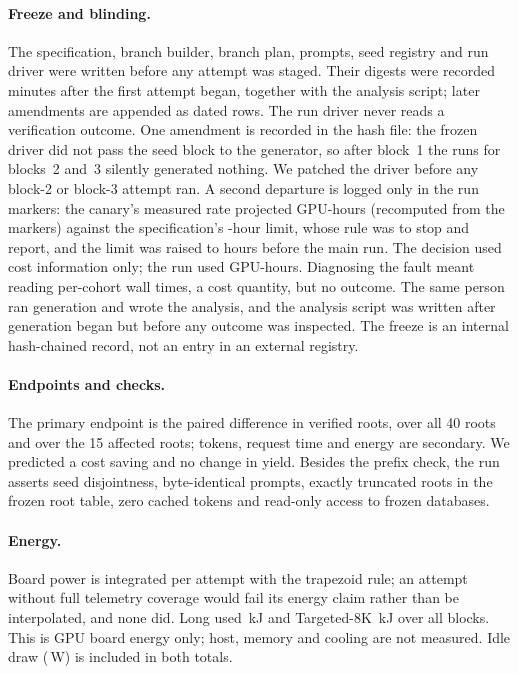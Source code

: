 \paragraph{Freeze and blinding.}
The specification, branch builder, branch plan, prompts, seed registry and run driver were written before any attempt was staged.  Their digests were recorded \CapHashDelayMin{} minutes after the first attempt began, together with the analysis script; later amendments are appended as dated rows.  The run driver never reads a verification outcome.  One amendment is recorded in the hash file: the frozen driver did not pass the seed block to the generator, so after block~1 the runs for blocks~2 and~3 silently generated nothing.  We patched the driver before any block-2 or block-3 attempt ran.  A second departure is logged only in the run markers: the canary's measured rate projected \CapCanaryProjHours{} GPU-hours (recomputed from the markers) against the specification's \CapBudgetFrozen{}-hour limit, whose rule was to stop and report, and the limit was raised to \CapBudgetRaised{} hours before the main run.  The decision used cost information only; the run used \CapRunGPUHours{} GPU-hours.  Diagnosing the fault meant reading per-cohort wall times, a cost quantity, but no outcome.  The same person ran generation and wrote the analysis, and the analysis script was written after generation began but before any outcome was inspected.  The freeze is an internal hash-chained record, not an entry in an external registry.

\paragraph{Endpoints and checks.}
The primary endpoint is the paired difference in verified roots, over all 40 roots and over the 15 affected roots; tokens, request time and energy are secondary.  We predicted a cost saving and no change in yield.  Besides the prefix check, the run asserts seed disjointness, byte-identical prompts, exactly \CapAffectedRoots{} truncated roots in the frozen root table, zero cached tokens and read-only access to frozen databases.

\paragraph{Energy.}
Board power is integrated per attempt with the trapezoid rule; an attempt without full telemetry coverage would fail its energy claim rather than be interpolated, and none did.  Long used \CapLongKJ{}\,kJ and Targeted-8K \CapTargetedKJ{}\,kJ over all blocks.  This is GPU board energy only; host, memory and cooling are not measured.  Idle draw (\CapIdleWatts{}\,W) is included in both totals.

